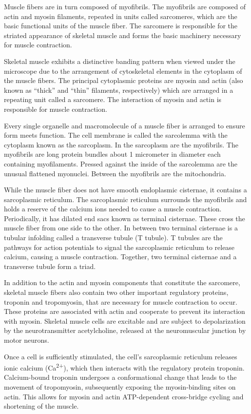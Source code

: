 Muscle fibers are in turn composed of myofibrils. The myofibrils are composed of actin and myosin filaments, repeated in units called sarcomeres, which are the basic functional units of the muscle fiber. The sarcomere is responsible for the striated appearance of skeletal muscle and forms the basic machinery necessary for muscle contraction.

Skeletal muscle exhibits a distinctive banding pattern when viewed under the microscope due to the arrangement of cytoskeletal elements in the cytoplasm of the muscle fibers. The principal cytoplasmic proteins are myosin and actin (also known as ``thick'' and ``thin'' filaments, respectively) which are arranged in a repeating unit called a sarcomere. The interaction of myosin and actin is responsible for muscle contraction.

Every single organelle and macromolecule of a muscle fiber is arranged to ensure form meets function. The cell membrane is called the sarcolemma with the cytoplasm known as the sarcoplasm. In the sarcoplasm are the myofibrils. The myofibrils are long protein bundles about 1 micrometer in diameter each containing myofilaments. Pressed against the inside of the sarcolemma are the unusual flattened myonuclei. Between the myofibrils are the mitochondria.

While the muscle fiber does not have smooth endoplasmic cisternae, it contains a sarcoplasmic reticulum. The sarcoplasmic reticulum surrounds the myofibrils and holds a reserve of the calcium ions needed to cause a muscle contraction. Periodically, it has dilated end sacs known as terminal cisternae. These cross the muscle fiber from one side to the other. In between two terminal cisternae is a tubular infolding called a transverse tubule (T tubule). T tubules are the pathways for action potentials to signal the sarcoplasmic reticulum to release calcium, causing a muscle contraction. Together, two terminal cisternae and a transverse tubule form a triad.

In addition to the actin and myosin components that constitute the sarcomere, skeletal muscle fibers also contain two other important regulatory proteins, troponin and tropomyosin, that are necessary for muscle contraction to occur. These proteins are associated with actin and cooperate to prevent its interaction with myosin. Skeletal muscle cells are excitable and are subject to depolarization by the neurotransmitter acetylcholine, released at the neuromuscular junction by motor neurons.

Once a cell is sufficiently stimulated, the cell's sarcoplasmic reticulum releases ionic calcium (Ca\textsuperscript{2+}), which then interacts with the regulatory protein troponin. Calcium-bound troponin undergoes a conformational change that leads to the movement of tropomyosin, subsequently exposing the myosin-binding sites on actin. This allows for myosin and actin ATP-dependent cross-bridge cycling and shortening of the muscle.

